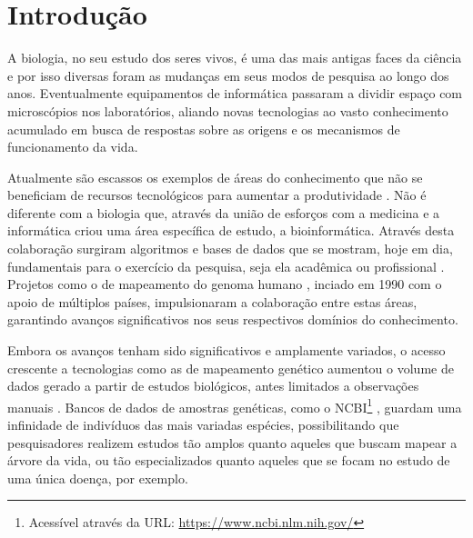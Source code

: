\documentclass[english,brazilian]{UNISINOSmonografia} %
\begin{document}

\begingroup
\hypersetup{linkcolor=defaultcolor}
	\tableofcontents
\endgroup

\chapter{Introdução}
\label{ch:intro}



A biologia, no seu estudo dos seres vivos, é uma das mais antigas faces da ciência e por isso diversas foram as mudanças em seus modos de pesquisa ao longo dos anos.
Eventualmente equipamentos de informática passaram a dividir espaço com microscópios nos laboratórios, aliando novas tecnologias ao vasto conhecimento acumulado em busca de respostas sobre as origens e os mecanismos de funcionamento da vida.


Atualmente são escassos os exemplos de áreas do conhecimento que não se beneficiam de recursos tecnológicos para aumentar a produtividade \cite{Denning2009}.
Não é diferente com a biologia que, através da união de esforços com a medicina e a informática criou uma área específica de estudo, a bioinformática.
Através desta colaboração surgiram algoritmos e bases de dados que se mostram, hoje em dia, fundamentais para o exercício da pesquisa, seja ela acadêmica ou profissional \cite{NCBI-Handbook}.
Projetos como o de mapeamento do genoma humano \cite{Venter2001}, inciado em 1990 com o apoio de múltiplos países, impulsionaram a colaboração entre estas áreas, garantindo avanços significativos nos seus respectivos domínios do conhecimento.


Embora os avanços tenham sido significativos e amplamente variados, o acesso crescente a tecnologias como as de mapeamento genético aumentou o volume de dados gerado a partir de estudos biológicos, antes limitados a observações manuais \cite{book:2119998}.
Bancos de dados de amostras genéticas, como o NCBI\footnote{
	Acessível através da URL: \url{https://www.ncbi.nlm.nih.gov/}
} \cite{NCBI-Handbook}, guardam uma infinidade de indivíduos das mais variadas espécies, possibilitando que pesquisadores realizem estudos tão amplos quanto aqueles que buscam mapear a árvore da vida, ou tão especializados quanto aqueles que se focam no estudo de uma única doença, por exemplo.
\end{document}

